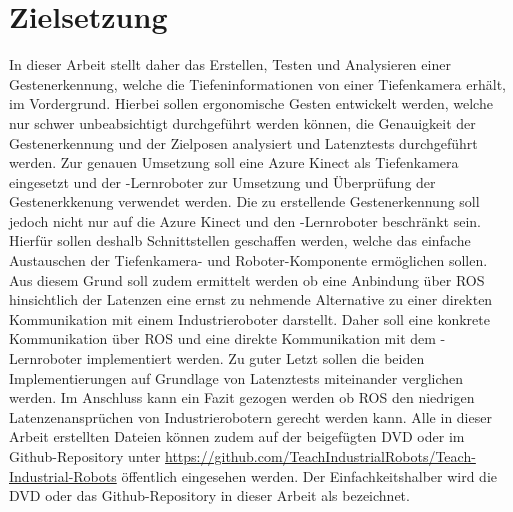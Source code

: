 \section{Zielsetzung} \label{sec:zielsetzung} %
In dieser Arbeit stellt daher das Erstellen, Testen und Analysieren einer Gestenerkennung, welche die Tiefeninformationen von einer Tiefenkamera erhält, im Vordergrund. Hierbei sollen ergonomische Gesten entwickelt werden, welche nur schwer unbeabsichtigt durchgeführt werden können, die Genauigkeit der Gestenerkennung und der Zielposen analysiert und Latenztests durchgeführt werden. Zur genauen Umsetzung soll eine Azure Kinect als Tiefenkamera eingesetzt und der -Lernroboter zur Umsetzung und Überprüfung der Gestenerkkenung verwendet werden. Die zu erstellende Gestenerkennung soll jedoch nicht nur auf die Azure Kinect und den -Lernroboter beschränkt sein. Hierfür sollen deshalb Schnittstellen geschaffen werden, welche das einfache Austauschen der Tiefenkamera- und Roboter-Komponente ermöglichen sollen. Aus diesem Grund soll zudem ermittelt werden ob eine Anbindung über ROS hinsichtlich der Latenzen eine ernst zu nehmende Alternative zu einer direkten Kommunikation mit einem Industrieroboter darstellt. Daher soll eine konkrete Kommunikation über ROS und eine direkte Kommunikation mit dem -Lernroboter implementiert werden. Zu guter Letzt sollen die beiden Implementierungen auf Grundlage von Latenztests miteinander verglichen werden. Im Anschluss kann ein Fazit gezogen werden ob ROS den niedrigen Latenzenansprüchen von Industrierobotern gerecht werden kann. Alle in dieser Arbeit erstellten Dateien können zudem auf der beigefügten DVD oder im Github-Repository unter \href{https://github.com/TeachIndustrialRobots/Teach-Industrial-Robots}{https://github.com/TeachIndustrialRobots/Teach-Industrial-Robots} öffentlich eingesehen werden. Der Einfachkeitshalber wird die DVD oder das Github-Repository in dieser Arbeit als  bezeichnet.
